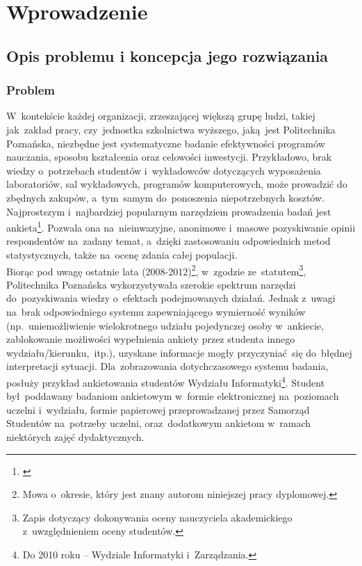 \chapter{Wprowadzenie}
\label{Chapter1}

\section{Opis problemu i koncepcja jego rozwiązania}
\label{Chapter11}

\subsection{Problem}
\label{Chapter111}

W~kontekście każdej organizacji, zrzeszającej większą grupę ludzi, takiej jak~zakład pracy, czy~jednostka szkolnictwa wyższego, jaką~jest Politechnika Poznańska, niezbędne jest systematyczne badanie efektywności programów nauczania, sposobu kształcenia oraz celowości inwestycji. Przykładowo, brak wiedzy o~potrzebach studentów i~wykładowców dotyczących wyposażenia laboratoriów, sal wykładowych, programów komputerowych, może prowadzić do zbędnych zakupów, a~tym~samym do~ponoszenia niepotrzebnych kosztów. Najprostszym i~najbardziej popularnym narzędziem prowadzenia badań jest ankieta\footnote{\cite{Wiki:BA}\cite{IP:Awbi}}. Pozwala ona na~nieinwazyjne, anonimowe i~masowe pozyskiwanie opinii respondentów na~zadany temat, a~dzięki zastosowaniu odpowiednich metod statystycznych, także na~ocenę zdania całej populacji. \\

Biorąc pod uwagę ostatnie lata (2008-2012)\footnote{Mowa o~okresie, który jest znany autorom niniejszej pracy dyplomowej.}, w~zgodzie ze~statutem\footnote{Zapis dotyczący dokonywania oceny nauczyciela akademickiego z~uwzględnieniem oceny studentów\cite{AP:SPP11}.}, Politechnika Poznańska wykorzystywała szerokie spektrum narzędzi do~pozyskiwania wiedzy o~efektach podejmowanych działań. Jednak z~uwagi na~brak odpowiedniego systemu zapewniającego wymierność wyników (np.~uniemożliwienie wielokrotnego udziału pojedynczej osoby w~ankiecie, zablokowanie możliwości wypełnienia ankiety przez studenta innego wydziału\slash kierunku,~itp.), uzyskane informacje mogły przyczyniać~się do~błędnej interpretacji sytuacji. Dla~zobrazowania dotychczasowego systemu badania, posłuży przykład ankietowania studentów Wydziału Informatyki\footnote{Do 2010 roku -- Wydziale Informatyki i~Zarządzania.}. Student był~poddawany badaniom ankietowym w~formie elektronicznej na~poziomach uczelni i~wydziału, formie papierowej przeprowadzanej przez Samorząd Studentów na~potrzeby uczelni, oraz~dodatkowym ankietom w~ramach niektórych zajęć dydaktycznych. \\

